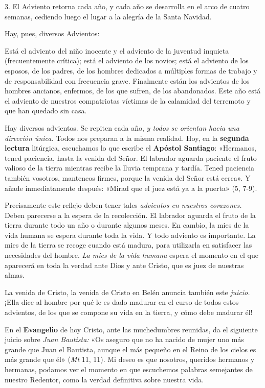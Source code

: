 \documentclass[]{article}
\begin{document}
3. El Adviento retorna cada año, y cada año se desarrolla en el arco de
cuatro semanas, cediendo luego el lugar a la alegría de la Santa
Navidad.

Hay, pues, diversos Advientos:

Está el adviento del niño inocente y el adviento de la juventud inquieta
(frecuentemente crítica); está el adviento de los novios; está el
adviento de los esposos, de los padres, de los hombres dedicados a
múltiples formas de trabajo y de responsabilidad con frecuencia grave.
Finalmente están los advientos de los hombres ancianos, enfermos, de los
que sufren, de los abandonados. Este año está el adviento de nuestros
compatriotas víctimas de la calamidad del terremoto y que han quedado
sin casa.

Hay diversos advientos. Se repiten cada año, \emph{y todos se orientan
hacia una dirección única.} Todos nos preparan a la misma realidad. Hoy,
en la \textbf{segunda lectura} litúrgica, escuchamos lo que escribe el
\textbf{Apóstol Santiago}: «Hermanos, tened paciencia, hasta la venida
del Señor. El labrador aguarda paciente el fruto valioso de la tierra
mientras recibe la lluvia temprana y tardía. Tened paciencia también
vosotros, manteneos firmes, porque la venida del Señor está cerca». Y
añade inmediatamente después: «Mirad que el juez está ya a la puerta»
(5, 7-9).

Precisamente este reflejo deben tener tales \emph{advientos en nuestros
corazones.} Deben parecerse a la espera de la recolección. El labrador
aguarda el fruto de la tierra durante todo un año o durante algunos
meses. En cambio, la mies de la vida humana se espera durante toda la
vida. Y todo adviento es importante. La mies de la tierra se recoge
cuando está madura, para utilizarla en satisfacer las necesidades del
hombre. \emph{La mies de la vida humana} espera el momento en el que
aparecerá en toda la verdad ante Dios y ante Cristo, que es juez de
nuestras almas.

La venida de Cristo, la venida de Cristo en Belén anuncia también este
\emph{juicio.} ¡Ella dice al hombre por qué le es dado madurar en el
curso de todos estos advientos, de los que se compone su vida en la
tierra, y cómo debe madurar él!

En el \textbf{Evangelio} de hoy Cristo, ante las muchedumbres reunidas,
da el siguiente juicio sobre \emph{Juan Bautista:} «Os aseguro que no ha
nacido de mujer uno más grande que Juan el Bautista, aunque el más
pequeño en el Reino de los cielos es más grande que él» (\emph{Mt} 11,
11). Mi deseo es que nosotros, queridos hermanos y hermanas, podamos ver
el momento en que escuchemos palabras semejantes de nuestro Redentor,
como la verdad definitiva sobre nuestra vida.
\end{document}
